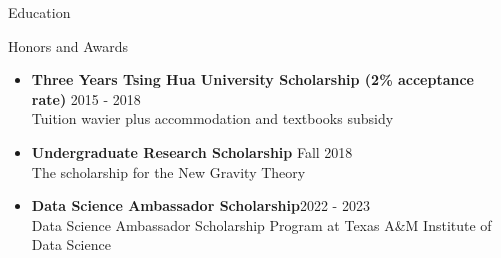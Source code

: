\documentclass{resume}
\begin{document}
\begin{rSection}{Education}
\begin{rSection}{Honors and Awards}
    \begin{itemize}
        \item \textbf{Three Years Tsing Hua University Scholarship (2\% acceptance rate)} \hfill 2015 - 2018 \\
        Tuition wavier plus accommodation and textbooks subsidy
        \item \textbf{Undergraduate Research Scholarship} \hfill Fall 2018 \\
        The scholarship for the New Gravity Theory
        \item \textbf{Data Science Ambassador Scholarship}\hfill 2022 - 2023\\
        Data Science Ambassador Scholarship Program at Texas A\&M Institute of Data Science
    \end{itemize}
\end{rSection}

\end{rSection}
\end{document}
